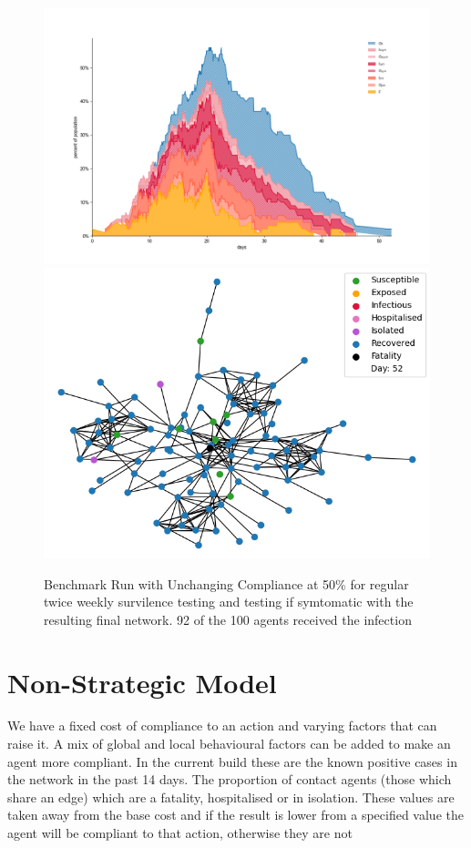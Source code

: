 \documentclass{article}
\begin{document}
\begin{figure}
  \centering
      \includegraphics[width=\textwidth]{Figure3}
      \includegraphics[width=\textwidth]{Figure3Net}
  \caption{Benchmark Run with Unchanging Compliance at 50\% for regular twice weekly survilence testing and testing if symtomatic with the resulting final network. 92 of the 100 agents received the infection}
\end{figure}


\section{Non-Strategic Model}
We have a fixed cost of compliance to an action and varying factors that can raise it. A mix of global and local behavioural factors can be added to make an agent more compliant. In the current build these are the known positive cases in the network in the past 14 days. The proportion of contact agents (those which share an edge) which are a fatality, hospitalised or in isolation. These values are taken away from the base cost and if the result is lower from a specified value the agent will be compliant to that action, otherwise they are not
\end{document}
